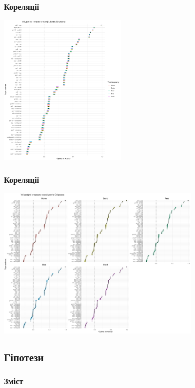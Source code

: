 \documentclass{beamer}
\begin{document}
\begin{frame}
  \frametitle{Кореляції}

  \begin{center}
    \includegraphics[height=3in]{plots/lab2/3-part/ci_intervals_v1.png}
  \end{center}
\end{frame}

\begin{frame}
  \frametitle{Кореляції}

  \begin{center}
    \includegraphics[height=3in]{plots/lab2/3-part/ci_intervals_v2.png}
  \end{center}
\end{frame}


\begin{frame}
  \section{Гіпотези}

  \frametitle{Зміст}
  \tableofcontents[currentsection]
\end{frame}
\end{document}

